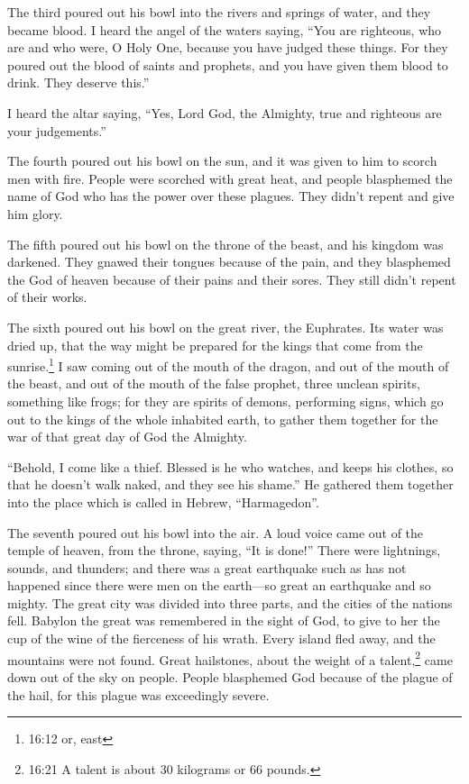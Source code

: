  The third poured out his bowl into the rivers and springs
of water, and they became blood.  I heard the angel of the
waters saying, ``You are righteous, who are and who were, O Holy One,
because you have judged these things.  For they poured out
the blood of saints and prophets, and you have given them blood to
drink. They deserve this.''

 I heard the altar saying, ``Yes, Lord God, the Almighty,
true and righteous are your judgements.''

 The fourth poured out his bowl on the sun, and it was given
to him to scorch men with fire.  People were scorched with
great heat, and people blasphemed the name of God who has the power over
these plagues. They didn't repent and give him glory.

 The fifth poured out his bowl on the throne of the beast,
and his kingdom was darkened. They gnawed their tongues because of the
pain,  and they blasphemed the God of heaven because of
their pains and their sores. They still didn't repent of their works.

 The sixth poured out his bowl on the great river, the
Euphrates. Its water was dried up, that the way might be prepared for
the kings that come from the sunrise.\footnote{16:12 or, east}
 I saw coming out of the mouth of the dragon, and out of
the mouth of the beast, and out of the mouth of the false prophet, three
unclean spirits, something like frogs;  for they are
spirits of demons, performing signs, which go out to the kings of the
whole inhabited earth, to gather them together for the war of that great
day of God the Almighty.

 ``Behold, I come like a thief. Blessed is he who watches,
and keeps his clothes, so that he doesn't walk naked, and they see his
shame.''  He gathered them together into the place which is
called in Hebrew, ``Harmagedon''.

 The seventh poured out his bowl into the air. A loud voice
came out of the temple of heaven, from the throne, saying, ``It is
done!''  There were lightnings, sounds, and thunders; and
there was a great earthquake such as has not happened since there were
men on the earth---so great an earthquake and so mighty. 
The great city was divided into three parts, and the cities of the
nations fell. Babylon the great was remembered in the sight of God, to
give to her the cup of the wine of the fierceness of his wrath.
 Every island fled away, and the mountains were not found.
 Great hailstones, about the weight of a talent,\footnote{16:21
  A talent is about 30 kilograms or 66 pounds.} came down out of the sky
on people. People blasphemed God because of the plague of the hail, for
this plague was exceedingly severe.

